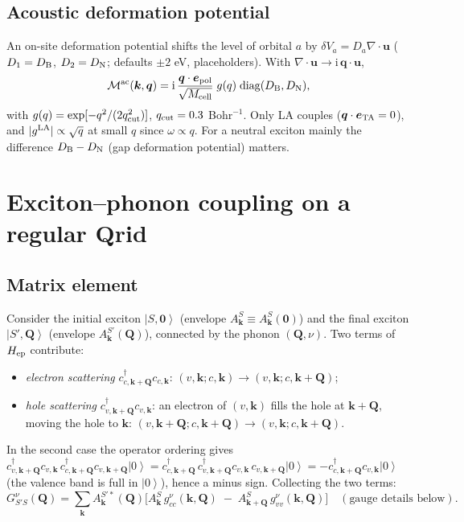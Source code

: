\documentclass[11pt,a4paper]{article}
\newcommand{\ii}{\mathrm{i}}
\newcommand{\kk}{\bm{k}}
\newcommand{\qq}{\bm{q}}
\newcommand{\QQ}{\bm{Q}}
\newcommand{\ket}[1]{\left|#1\right\rangle}
\begin{document}
\subsection{Acoustic deformation potential}
An on-site deformation potential shifts the level of orbital $a$ by $\delta V_a=D_a\nabla\!\cdot\!\bm u$ ($D_1=D_{\rm B}$, $D_2=D_{\rm N}$; defaults $\pm2$ eV, placeholders). With $\nabla\!\cdot\!\bm u\to\ii\,\qq\cdot\bm u$,
\begin{equation}
\mathcal M^{\rm ac}(\kk,\qq)=\ii\,\frac{\qq\cdot\bm e_{\rm pol}}{\sqrt{M_{\rm cell}}}\;g(q)\;\mathrm{diag}(D_{\rm B},D_{\rm N}),
\end{equation}
with $g(q)=\exp[-q^2/(2q_{\rm cut}^2)]$, $q_{\rm cut}=0.3$ Bohr$^{-1}$. Only LA couples ($\qq\cdot\bm e_{\rm TA}=0$), and $|g^{\rm LA}|\propto\sqrt q$ at small $q$ since $\omega\propto q$. For a neutral exciton mainly the difference $D_{\rm B}-D_{\rm N}$ (gap deformation potential) matters.

\section{Exciton--phonon coupling on a regular \texorpdfstring{$\bm Q$} grid}
\label{sec:exph}

\subsection{Matrix element}
Consider the initial exciton $\ket{S,\bm0}$ (envelope $A^S_{\kk}\equiv A^S_{\kk}(\bm0)$) and the final exciton $\ket{S',\QQ}$ (envelope $A^{S'}_{\kk}(\QQ)$), connected by the phonon $(\QQ,\nu)$. Two terms of $H_{\rm ep}$ contribute:
\begin{itemize}[leftmargin=*,itemsep=0pt]
\item \emph{electron scattering} $c^\dagger_{c,\kk+\QQ}c_{c,\kk}$: $(v,\kk;c,\kk)\to(v,\kk;c,\kk+\QQ)$;
\item \emph{hole scattering} $c^\dagger_{v,\kk+\QQ}c_{v,\kk}$: an electron of $(v,\kk)$ fills the hole at $\kk+\QQ$, moving the hole to $\kk$: $(v,\kk+\QQ;c,\kk+\QQ)\to(v,\kk;c,\kk+\QQ)$.
\end{itemize}
In the second case the operator ordering gives
$c^\dagger_{v,\kk+\QQ}c_{v,\kk}\,c^\dagger_{c,\kk+\QQ}c_{v,\kk+\QQ}\ket0=c^\dagger_{c,\kk+\QQ}\,c^\dagger_{v,\kk+\QQ}c_{v,\kk}\,c_{v,\kk+\QQ}\ket0=-c^\dagger_{c,\kk+\QQ}c_{v,\kk}\ket0$
(the valence band is full in $\ket0$), hence a minus sign. Collecting the two terms:
\begin{equation}
G^\nu_{S'S}(\QQ)=\sum_{\kk}A^{S'*}_{\kk}(\QQ)\Big[A^S_{\kk}\,g^\nu_{cc}(\kk,\QQ)\;-\;A^S_{\kk+\QQ}\,g^\nu_{vv}(\kk,\QQ)\Big]\quad(\text{gauge details below}).
\label{eq:Gnaive}
\end{equation}
\end{document}
